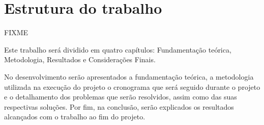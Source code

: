 \section{Estrutura do trabalho}

FIXME

Este trabalho será dividido em quatro capítulos: Fundamentação teórica, Metodologia, Resultados e Considerações Finais.

No desenvolvimento serão apresentados a fundamentação teórica, a metodologia utilizada na execução do projeto o cronograma que será seguido durante o projeto e o detalhamento dos problemas que serão resolvidos, assim como das suas respectivas soluções. Por fim, na conclusão, serão explicados os resultados alcançados com o trabalho ao fim do projeto.
